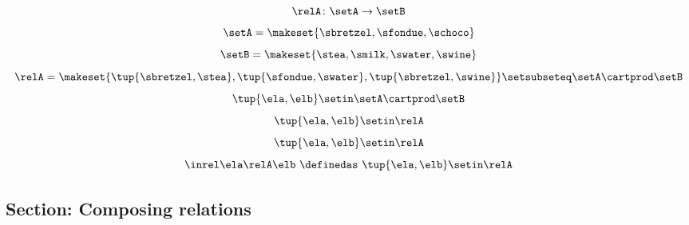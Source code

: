 \begin{forslides}

\begin{equation}\label{eq:slides_session2_76}
\relA \colon \setA \to \setB
\end{equation}
 \begin{equation}\label{eq:slides_session2_77}
\setA = \makeset{ \sbretzel, \sfondue, \schoco }
\end{equation}
\begin{equation}\label{eq:slides_session2_78}
\setB = \makeset{ \stea, \smilk, \swater, \swine }
\end{equation}
 \begin{equation}\label{eq:slides_session2_79}
\relA = \makeset{ \tup{\sbretzel, \stea}, \tup{\sfondue, \swater}, \tup{\sbretzel, \swine} } \setsubseteq \setA \cartprod \setB
\end{equation}
 \begin{equation}\label{eq:slides_session2_80}
\tup{\ela,\elb} \setin \setA \cartprod \setB
\end{equation}
 \begin{equation}\label{eq:slides_session2_81}
\tup{\ela,\elb} \setin \relA
\end{equation}
\begin{equation}\label{eq:slides_session2_82}
\tup{\ela,\elb}\setin \relA
\end{equation}
 \begin{equation}\label{eq:slides_session2_83}
\inrel \ela \relA \elb \ \definedas\  \tup{\ela,\elb}\setin \relA
\end{equation}

\subsection{Section: Composing relations}


\end{forslides}
